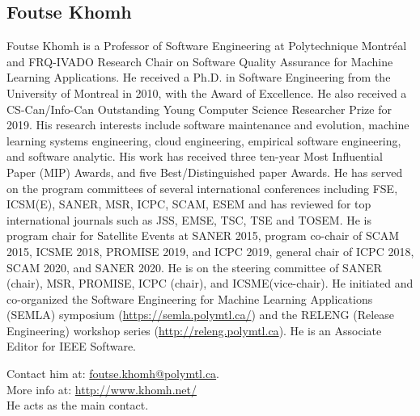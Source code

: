 \subsection{Foutse Khomh}
Foutse Khomh is a Professor of Software Engineering at Polytechnique Montréal and FRQ-IVADO Research Chair on Software Quality Assurance for Machine Learning Applications.
He received a Ph.D. in Software Engineering from the University of Montreal in 2010, with the Award of Excellence.
He also received a CS-Can/Info-Can Outstanding Young Computer Science Researcher Prize for 2019.
His research interests include software maintenance and evolution, machine learning systems engineering, cloud engineering, empirical software engineering, and software analytic.
His work has received three ten-year Most Influential Paper (MIP) Awards, and five Best/Distinguished paper Awards.
He has served on the program committees of several international conferences including FSE, ICSM(E), SANER, MSR, ICPC, SCAM, ESEM and has reviewed for top international journals such as JSS, EMSE, TSC, TSE and TOSEM.
He is program chair for Satellite Events at SANER 2015, program co-chair of SCAM 2015, ICSME 2018, PROMISE 2019, and ICPC 2019, general chair of ICPC 2018, SCAM 2020, and SANER 2020. He is on the steering committee of SANER (chair), MSR, PROMISE, ICPC (chair), and ICSME(vice-chair).
He initiated and co-organized the Software Engineering for Machine Learning Applications (SEMLA) symposium (\url{https://semla.polymtl.ca/}) and the RELENG (Release Engineering) workshop series (\url{http://releng.polymtl.ca}).
He is an Associate Editor for IEEE Software.

\medskip
\noindent Contact him at: \href{mailto:foutse.khomh@polymtl.ca}{foutse.khomh@polymtl.ca}.\\
More info at: \url{http://www.khomh.net/}\\
He acts as the main contact.
